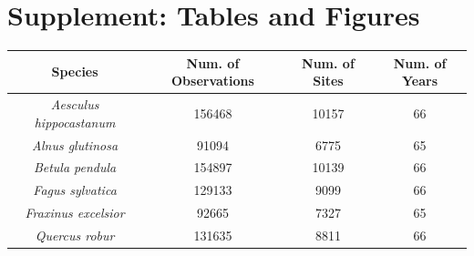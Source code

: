 \documentclass{article}\usepackage[]{graphicx}\usepackage[]{color}
\begin{document}
\section*{Supplement: Tables and Figures}
  
\begin{center}
 \label{tab:spp} 
\begin{tabular}{c c c c}
\hline
\textbf{Species} & \textbf{Num. of Observations} & \textbf{Num. of Sites} & \textbf{Num. of Years} \\
\hline
\textit{Aesculus hippocastanum} & 156468 & 10157 & 66  \\
\textit{Alnus glutinosa} & 91094 & 6775 & 65 \\
\textit{Betula pendula} & 154897 & 10139 & 66 \\
\textit{Fagus sylvatica} & 129133 & 9099 & 66 \\
\textit{Fraxinus excelsior} & 92665 & 7327 & 65 \\
\textit{Quercus robur} & 131635  & 8811 & 66 \\
\end{tabular}
\end{center}

\vspace{15ex}
\end{document}
